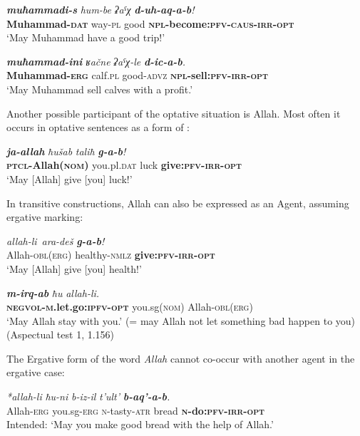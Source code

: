 ﻿\documentclass[output=paper]{langsci/langscibook}
\begin{document}
\ea %
\gll \emph{\textbf{muħammadi-s}} \emph{hum-be} \emph{ʡaˤχ} \emph{\textbf{d-uh-aq-a-b}!}\\
 \textbf{Muhammad-\textsc{dat}} way-\textsc{pl} good \textbf{\textsc{npl}-become:\textsc{pfv}-\textsc{caus}-\textsc{irr}-\textsc{opt}}\\
\glt `May Muhammad have a good trip!'

\ex %
\gll \emph{\textbf{muħammad-ini}} \emph{ʁačne} \emph{ʡaˤχ-le} \emph{\textbf{d-ic-a-b}.}\\
 \textbf{Muhammad-\textsc{erg}} calf.\textsc{pl} good-\textsc{advz} \textbf{\textsc{npl}-sell:\textsc{pfv}-\textsc{irr}-\textsc{opt}}\\
\glt `May Muhammad sell calves with a profit.'
\z

Another possible participant of the optative situation is Allah. Most
often it occurs in optative sentences as a form of :

\ea %
\gll \emph{\textbf{ja-allah}} \emph{ħušab} \emph{taliħ} \emph{\textbf{g-a-b}!}\\
 \textbf{\textsc{ptcl}-Allah(\textsc{nom})} you.pl.\textsc{dat} luck \textbf{give:\textsc{pfv}-\textsc{irr}-\textsc{opt}}\\
\glt `May [Allah] give [you] luck!'
\z

In transitive constructions, Allah can also be expressed as an Agent,
assuming ergative marking:

\ea %
\gll \emph{allah-li}\,\footnotemark{} \emph{ara-deš} \emph{\textbf{g-a-b}!}\\
Allah-\textsc{obl}(\textsc{erg}) healthy-\textsc{nmlz} \textbf{give:\textsc{pfv}-\textsc{irr}-\textsc{opt}}\\
\glt `May [Allah] give [you] health!'


\ex %
\gll \emph{\textbf{m-irq-ab}} \emph{ħu} \emph{allah-li.}\\
\textbf{\textsc{negvol}-\textsc{m}.let.go:\textsc{ipfv}-\textsc{opt}} you.sg(\textsc{nom}) Allah-\textsc{obl}(\textsc{erg})\\
\glt `May Allah stay with you.' (= may Allah not let something bad happen to
you) (Aspectual test 1, 1.156)
\z

The Ergative form of the word \emph{Allah} cannot co-occur with another
agent in the ergative case:

\ea %
\gll \emph{*allah-li} \emph{ħu-ni} \emph{b-iz-il} \emph{t'ult'} \emph{\textbf{b-aq'-a-b}.}\\
Allah-\textsc{erg} you.sg-\textsc{erg} \textsc{n}-tasty-\textsc{atr} bread \textbf{\textsc{n}-do:\textsc{pfv}-\textsc{irr}-\textsc{opt}}\\
\glt Intended: `May you make good bread with the help of Allah.'
\z
\end{document}
